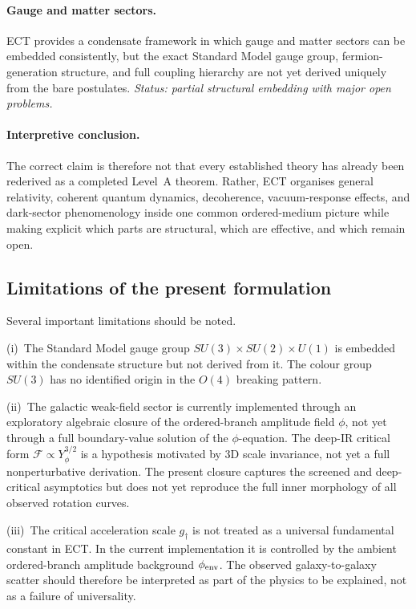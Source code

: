 \documentclass[11pt,a4paper]{article}
\numberwithin{equation}{section}
\begin{document}
\paragraph{Gauge and matter sectors.}
ECT provides a condensate framework in which gauge and matter sectors can
be embedded consistently, but the exact Standard Model gauge group,
fermion-generation structure, and full coupling hierarchy are not yet
derived uniquely from the bare postulates.
\emph{Status: partial structural embedding with major open problems.}

\paragraph{Interpretive conclusion.}
The correct claim is therefore not that every established theory has
already been rederived as a completed Level~A theorem.
Rather, ECT organises general relativity, coherent quantum dynamics,
decoherence, vacuum-response effects, and dark-sector phenomenology
inside one common ordered-medium picture while making explicit which
parts are structural, which are effective, and which remain open.


\subsection{Limitations of the present formulation}

Several important limitations should be noted.

(i)~The Standard Model gauge group $SU(3) \times SU(2) \times U(1)$ is
embedded within the condensate structure but not derived from it.
The colour group $SU(3)$ has no identified origin in the $O(4)$
breaking pattern.

(ii)~The galactic weak-field sector is currently implemented
through an exploratory algebraic closure of the ordered-branch amplitude
field $\phi$, not yet through a full boundary-value solution
of the $\phi$-equation.  The deep-IR critical form
$\mathcal{F} \propto Y_\phi^{3/2}$ is a hypothesis motivated
by 3D scale invariance, not yet a full nonperturbative
derivation.  The present closure captures the screened and
deep-critical asymptotics but does not yet reproduce the
full inner morphology of all observed rotation curves.

(iii)~The critical acceleration scale $g_\dagger$ is not
treated as a universal fundamental constant in ECT.
In the current implementation it is controlled by the
ambient ordered-branch amplitude background $\phi_{\rm env}$.
The observed galaxy-to-galaxy scatter should therefore be
interpreted as part of the physics to be explained, not
as a failure of universality.
\end{document}
